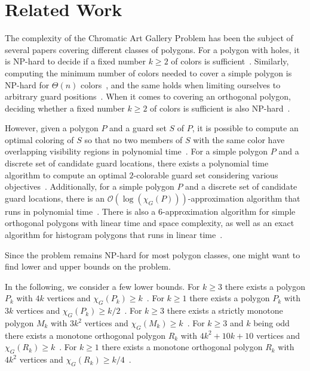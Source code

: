 \section{Related Work}
The complexity of the Chromatic Art Gallery Problem has been the subject of several papers covering different classes of polygons.
For a polygon with holes, it is NP-hard to decide if a fixed number $k \geq 2$ of colors is sufficient~\cite{fekete2014complexity}. Similarly, computing the minimum number of colors needed to cover a simple polygon is NP-hard for $\Theta(n)$ colors~\cite{fekete2014complexity}, and the same holds when limiting ourselves to arbitrary guard positions~\cite{fekete2014chromatic}. When it comes to covering an orthogonal polygon, deciding whether a fixed number $k \geq 2$ of colors is sufficient is also NP-hard~\cite{hoorfar2021np}.

However, given a polygon $P$ and a guard set $S$ of $P$, it is possible to compute an optimal coloring of $S$ so that no two members of $S$ with the same color have overlapping visibility regions in polynomial time~\cite{erickson2011many}. For a simple polygon $P$ and a discrete set of candidate guard locations, there exists a polynomial time algorithm to compute an optimal $2$-colorable guard set considering various objectives~\cite{fekete2014chromatic}. Additionally, for a simple polygon $P$ and a discrete set of candidate guard locations, there is an $\mathcal{O}(\log (\chi_G(P)))$-approximation algorithm that runs in polynomial time~\cite{fekete2014chromatic}. There is also a $6$-approximation algorithm for simple orthogonal polygons with linear time and space complexity, as well as an exact algorithm for histogram polygons that runs in linear time~\cite{hoorfar2021np}.

Since the problem remains NP-hard for most polygon classes, one might want to find lower and upper bounds on the problem.

In the following, we consider a few lower bounds.
For $k \geq 3$ there exists a polygon $P_k$ with $4k$ vertices and $\chi_G(P_k) \geq k$~\cite{erickson2012art}.
For $k \geq 1$ there exists a polygon $P_k$ with $3k$ vertices and $\chi_G(P_k) \geq k/2$~\cite{bartschi2011coloring}.
For $k \geq 3$ there exists a strictly monotone polygon $M_k$ with $3k^2$ vertices and $\chi_G(M_k) \geq k$~\cite{erickson2012art}.
For $k \geq 3$ and $k$ being odd there exists a monotone orthogonal polygon $R_k$ with $4k^2 + 10k + 10$ vertices and $\chi_G(R_k) \geq k$~\cite{erickson2012art}.
For $k \geq 1$ there exists a monotone orthogonal polygon $R_k$ with $4k^2$ vertices and $\chi_G(R_k) \geq k/4$~\cite{bartschi2011coloring}.

